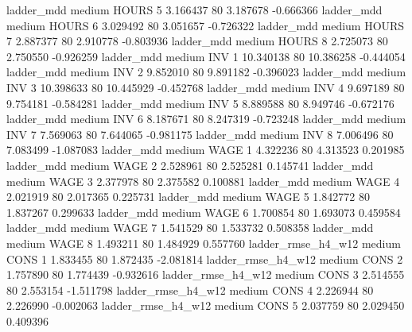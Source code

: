          ladder_mdd     medium    HOURS                 5  3.166437 80       3.187678          -0.666366
         ladder_mdd     medium    HOURS                 6  3.029492 80       3.051657          -0.726322
         ladder_mdd     medium    HOURS                 7  2.887377 80       2.910778          -0.803936
         ladder_mdd     medium    HOURS                 8  2.725073 80       2.750550          -0.926259
         ladder_mdd     medium      INV                 1 10.340138 80      10.386258          -0.444054
         ladder_mdd     medium      INV                 2  9.852010 80       9.891182          -0.396023
         ladder_mdd     medium      INV                 3 10.398633 80      10.445929          -0.452768
         ladder_mdd     medium      INV                 4  9.697189 80       9.754181          -0.584281
         ladder_mdd     medium      INV                 5  8.889588 80       8.949746          -0.672176
         ladder_mdd     medium      INV                 6  8.187671 80       8.247319          -0.723248
         ladder_mdd     medium      INV                 7  7.569063 80       7.644065          -0.981175
         ladder_mdd     medium      INV                 8  7.006496 80       7.083499          -1.087083
         ladder_mdd     medium     WAGE                 1  4.322236 80       4.313523           0.201985
         ladder_mdd     medium     WAGE                 2  2.528961 80       2.525281           0.145741
         ladder_mdd     medium     WAGE                 3  2.377978 80       2.375582           0.100881
         ladder_mdd     medium     WAGE                 4  2.021919 80       2.017365           0.225731
         ladder_mdd     medium     WAGE                 5  1.842772 80       1.837267           0.299633
         ladder_mdd     medium     WAGE                 6  1.700854 80       1.693073           0.459584
         ladder_mdd     medium     WAGE                 7  1.541529 80       1.533732           0.508358
         ladder_mdd     medium     WAGE                 8  1.493211 80       1.484929           0.557760
 ladder_rmse_h4_w12     medium     CONS                 1  1.833455 80       1.872435          -2.081814
 ladder_rmse_h4_w12     medium     CONS                 2  1.757890 80       1.774439          -0.932616
 ladder_rmse_h4_w12     medium     CONS                 3  2.514555 80       2.553154          -1.511798
 ladder_rmse_h4_w12     medium     CONS                 4  2.226944 80       2.226990          -0.002063
 ladder_rmse_h4_w12     medium     CONS                 5  2.037759 80       2.029450           0.409396
